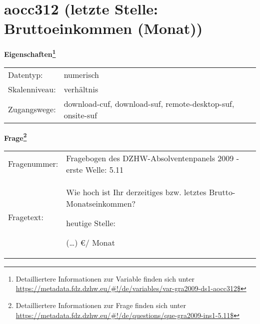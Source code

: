 
    \setcounter{footnote}{0}

    \vspace*{-1.8cm}
	\section{aocc312 (letzte Stelle: Bruttoeinkommen (Monat))}
	\label{section:aocc312}



    \vspace*{0.5cm}
    \noindent\textbf{Eigenschaften\footnote{Detailliertere Informationen zur Variable finden sich unter
		\url{https://metadata.fdz.dzhw.eu/\#!/de/variables/var-gra2009-ds1-aocc312$}}}\\
	\begin{tabularx}{\hsize}{@{}lX}
	Datentyp: & numerisch \\
	Skalenniveau: & verhältnis \\
	Zugangswege: &
	  download-cuf, 
	  download-suf, 
	  remote-desktop-suf, 
	  onsite-suf
 \\
    \end{tabularx}



				\vspace*{0.5cm}
                \noindent\textbf{Frage\footnote{Detailliertere Informationen zur Frage finden sich unter
		              \url{https://metadata.fdz.dzhw.eu/\#!/de/questions/que-gra2009-ins1-5.11$}}}\\
				\begin{tabularx}{\hsize}{@{}lX}
					Fragenummer: &
					  Fragebogen des DZHW-Absolventenpanels 2009 - erste Welle:
					  5.11
 \\
					Fragetext: & Wie hoch ist Ihr derzeitiges bzw. letztes Brutto- Monatseinkommen?\par  heutige Stelle:\par  (…) €/ Monat \\
				\end{tabularx}





